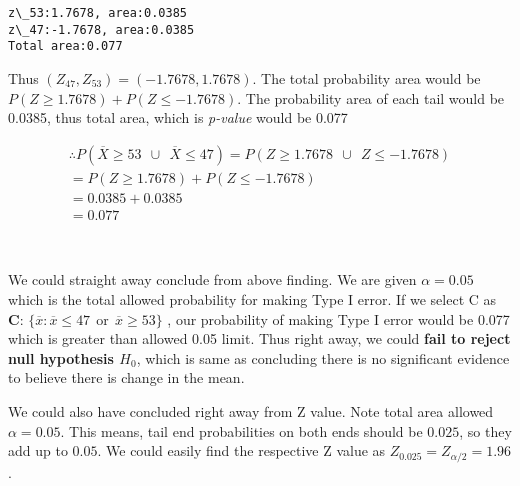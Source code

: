 \documentclass[float=false,crop=false]{standalone}
\begin{document}
    \begin{Verbatim}[commandchars=\\\{\},fontsize=\footnotesize]
z\_53:1.7678, area:0.0385
z\_47:-1.7678, area:0.0385
Total area:0.077

    \end{Verbatim}

    Thus \((Z_{47},Z_{53}) = (-1.7678, 1.7678)\). The total probability area
would be \(P(Z \geq 1.7678) + P(Z \leq -1.7678)\). The probability area
of each tail would be 0.0385, thus total area, which is \emph{p-value}
would be 0.077

\begin{equation}
\begin{aligned}
    \therefore P(\overline{X} \geq 53 \ \ \cup \ \ \overline{X} \leq 47) 
    = P(Z \geq 1.7678 \ \ \cup \ \ Z \leq -1.7678) \nonumber \\
    = P(Z \geq 1.7678) + P(Z \leq -1.7678) \nonumber \\
    =0.0385 + 0.0385 \nonumber \\ = 0.077 \label{eq:004}
\end{aligned}
\end{equation}
    \begin{center}
    \end{center}
    { \hspace*{\fill} \\}
    
    We could straight away conclude from above finding. We are given
\(\alpha = 0.05\) which is the total allowed probability for making Type
I error. If we select C as \textbf{C}:
\(\{\overline{x}: \overline{x} \leq 47 \ \ \text{or} \ \ \overline{x} \geq 53\}\)
, our probability of making Type I error would be 0.077 which is greater
than allowed 0.05 limit. Thus right away, we could \textbf{fail to
reject null hypothesis \(H_0\)}, which is same as concluding there is no
significant evidence to believe there is change in the mean.

We could also have concluded right away from Z value. Note total area
allowed \(\alpha = 0.05\). This means, tail end probabilities on both
ends should be \(0.025\), so they add up to \(0.05\). We could easily
find the respective Z value as \(Z_{0.025} = Z_{\alpha/2} = 1.96\).
\end{document}
